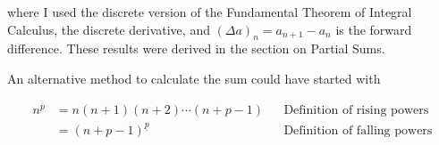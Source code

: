 \documentclass{article}
\begin{document}
\noindent where I used the discrete version of the Fundamental Theorem of
Integral Calculus, the discrete derivative, and $(\Delta a)_n=a_{n+1}-a_n$ is
the forward difference. These results were derived in the section on Partial
Sums.

An alternative method to calculate the sum could have started with

\begin{align*}
    n^{\overline{p}}&=n(n+1)(n+2)\cdots(n+p-1) && \text{Definition of rising powers}\\
    &=(n+p-1)^{\underline{p}}  && \text{Definition of falling powers}
\end{align*}
\end{document}
